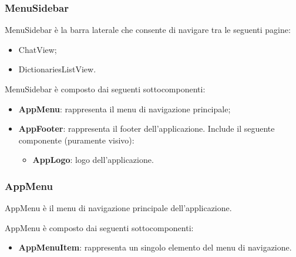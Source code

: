 \subsubsection{MenuSidebar}

\par MenuSidebar è la barra laterale che consente di navigare tra le seguenti pagine:
\begin{itemize}
  \item ChatView;
  \item DictionariesListView.
\end{itemize}

\par MenuSidebar è composto dai seguenti sottocomponenti:
\begin{itemize}
  \item \textbf{AppMenu}: rappresenta il menu di navigazione principale;
  \item \textbf{AppFooter}: rappresenta il footer dell'applicazione. Include il seguente componente (puramente visivo):
  \begin{itemize}
    \item \textbf{AppLogo}: logo dell'applicazione.
  \end{itemize}
\end{itemize}

\subsubsection{AppMenu}

\par AppMenu è il menu di navigazione principale dell'applicazione.

\par AppMenu è composto dai seguenti sottocomponenti:
\begin{itemize}
  \item \textbf{AppMenuItem}: rappresenta un singolo elemento del menu di navigazione.
\end{itemize}